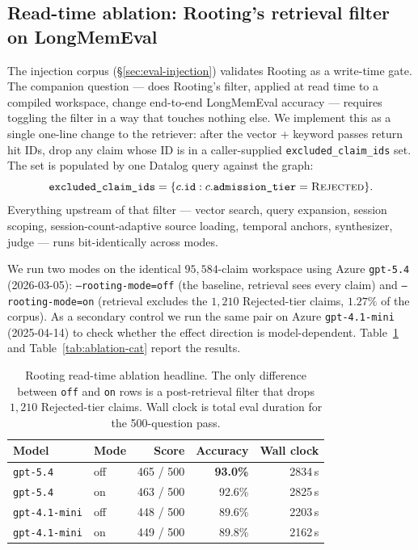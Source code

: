 \documentclass[10pt,a4paper]{article}
\begin{document}
\subsection{Read-time ablation: Rooting's retrieval filter on LongMemEval}
\label{sec:eval-ablation}

The injection corpus (\S\ref{sec:eval-injection}) validates Rooting as a
write-time gate. The companion question --- does Rooting's filter,
applied at read time to a compiled workspace, change end-to-end
LongMemEval accuracy --- requires toggling the filter in a way that
touches nothing else. We implement this as a single one-line change to
the retriever: after the vector + keyword passes return hit IDs, drop
any claim whose ID is in a caller-supplied
\texttt{excluded\_claim\_ids} set. The set is populated by one Datalog
query against the graph:
\[
\texttt{excluded\_claim\_ids} =
  \{c.\texttt{id} : c.\texttt{admission\_tier} = \textsc{Rejected}\}.
\]
Everything upstream of that filter --- vector search, query expansion,
session scoping, session-count-adaptive source loading, temporal
anchors, synthesizer, judge --- runs bit-identically across modes.

We run two modes on the identical $95{,}584$-claim workspace using
Azure \texttt{gpt-5.4} (2026-03-05):
\texttt{--rooting-mode=off} (the baseline, retrieval sees every
claim) and \texttt{--rooting-mode=on} (retrieval excludes the $1{,}210$
Rejected-tier claims, $1.27\%$ of the corpus). As a secondary control
we run the same pair on Azure \texttt{gpt-4.1-mini} (2025-04-14)
to check whether the effect direction is model-dependent.
Table~\ref{tab:ablation-head} and Table~\ref{tab:ablation-cat} report
the results.

\begin{table}[t]
\centering
\small
\caption{Rooting read-time ablation headline. The only difference between
\texttt{off} and \texttt{on} rows is a post-retrieval filter that
drops $1{,}210$ Rejected-tier claims. Wall clock is total eval
duration for the 500-question pass.}
\label{tab:ablation-head}
\begin{tabular}{@{}llrrr@{}}
\toprule
Model & Mode & Score & Accuracy & Wall clock \\
\midrule
\texttt{gpt-5.4}        & off & 465 / 500 & \textbf{93.0\%} & 2834\,s \\
\texttt{gpt-5.4}        & on  & 463 / 500 & 92.6\% & 2825\,s \\[2pt]
\texttt{gpt-4.1-mini}   & off & 448 / 500 & 89.6\% & 2203\,s \\
\texttt{gpt-4.1-mini}   & on  & 449 / 500 & 89.8\% & 2162\,s \\
\bottomrule
\end{tabular}
\end{table}
\end{document}
